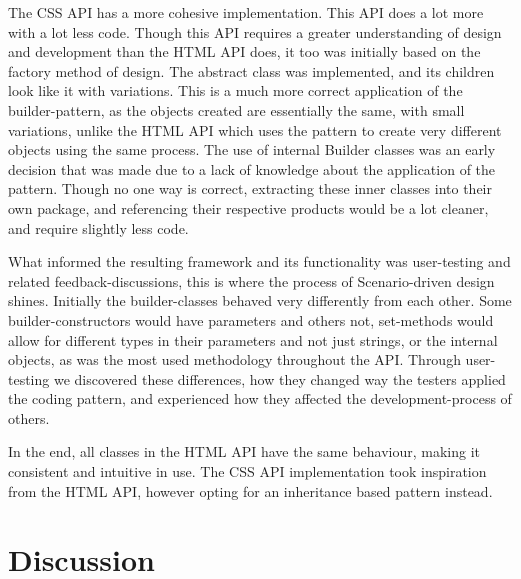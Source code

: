\documentclass[12pt]{article}
\begin{document}
    The CSS API has a more cohesive implementation. This API does a lot more with a lot less code. Though this API requires a greater understanding of design and development than the HTML API does, it too was initially based on the factory method of design. The abstract class was implemented, and its children look like it with variations. This is a much more correct application of the builder-pattern, as the objects created are essentially the same, with small variations, unlike the HTML API which uses the pattern to create very different objects using the same process.
    The use of internal Builder classes was an early decision that was made due to a lack of knowledge about the application of the pattern. Though no one way is correct, extracting these inner classes into their own package, and referencing their respective products would be a lot cleaner, and require slightly less code.

    What informed the resulting framework and its functionality was user-testing and related feedback-discussions, this is where the process of Scenario-driven design shines. Initially the builder-classes behaved very differently from each other. Some builder-constructors would have parameters and others not, set-methods would allow for different types in their parameters and not just strings, or the internal objects, as was the most used methodology throughout the API. Through user-testing we discovered these differences, how they changed way the testers applied the coding pattern, and experienced how they affected the development-process of others.

    In the end, all classes in the HTML API have the same behaviour, making it consistent and intuitive in use. The CSS API implementation took inspiration from the HTML API, however opting for an inheritance based pattern instead.



\section{Discussion}
\end{document}
